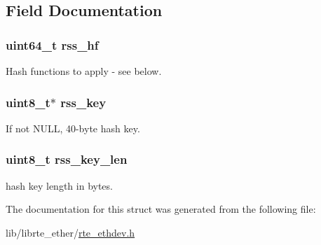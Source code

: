 \subsection{Field Documentation}
\hypertarget{structrte__eth__rss__conf_ad70f17882a835e5d4e38c64a9f872fdc}{}
\subsubsection[{rss\+\_\+hf}]{\setlength{\rightskip}{0pt plus 5cm}uint64\+\_\+t rss\+\_\+hf}\label{structrte__eth__rss__conf_ad70f17882a835e5d4e38c64a9f872fdc}
Hash functions to apply -\/ see below. \hypertarget{structrte__eth__rss__conf_a931e368ed1b5a8211a963bc05c503739}{}
\subsubsection[{rss\+\_\+key}]{\setlength{\rightskip}{0pt plus 5cm}uint8\+\_\+t$\ast$ rss\+\_\+key}\label{structrte__eth__rss__conf_a931e368ed1b5a8211a963bc05c503739}
If not N\+U\+L\+L, 40-\/byte hash key. \hypertarget{structrte__eth__rss__conf_ab8f32e03af342f65e890c42b24511866}{}
\subsubsection[{rss\+\_\+key\+\_\+len}]{\setlength{\rightskip}{0pt plus 5cm}uint8\+\_\+t rss\+\_\+key\+\_\+len}\label{structrte__eth__rss__conf_ab8f32e03af342f65e890c42b24511866}
hash key length in bytes. 

The documentation for this struct was generated from the following file\+:\begin{DoxyCompactItemize}
\item 
lib/librte\+\_\+ether/\hyperlink{rte__ethdev_8h}{rte\+\_\+ethdev.\+h}\end{DoxyCompactItemize}
